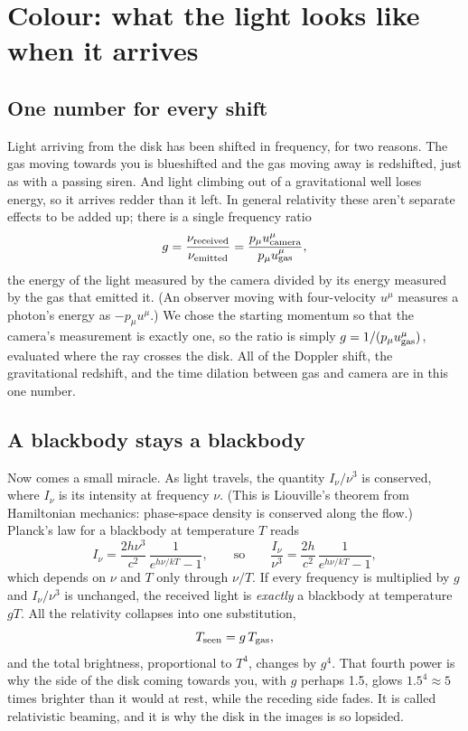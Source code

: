 \documentclass[11pt,a4paper]{article}
\begin{document}
\section{Colour: what the light looks like when it arrives}\label{sec:colour}

\subsection{One number for every shift}

Light arriving from the disk has been shifted in frequency, for two reasons. The gas
moving towards you is blueshifted and the gas moving away is redshifted, just as with a
passing siren. And light climbing out of a gravitational well loses energy, so it arrives
redder than it left. In general relativity these aren't separate effects to be added up;
there is a single frequency ratio
\begin{equation}
  g = \frac{\nu_{\rm received}}{\nu_{\rm emitted}}
    = \frac{p_\mu u^\mu_{\rm camera}}{p_\mu u^\mu_{\rm gas}} ,
\end{equation}
the energy of the light measured by the camera divided by its energy measured by the gas
that emitted it. (An observer moving with four-velocity $u^\mu$ measures a photon's energy
as $-p_\mu u^\mu$.) We chose the starting momentum so that the camera's measurement is
exactly one, so the ratio is simply $g = 1/(p_\mu u^\mu_{\rm gas})$, evaluated where the ray
crosses the disk. All of the Doppler shift, the gravitational redshift, and the time
dilation between gas and camera are in this one number.

\subsection{A blackbody stays a blackbody}

Now comes a small miracle. As light travels, the quantity $I_\nu/\nu^3$ is conserved, where
$I_\nu$ is its intensity at frequency $\nu$. (This is Liouville's theorem from Hamiltonian
mechanics: phase-space density is conserved along the flow.) Planck's law for a blackbody
at temperature $T$ reads
\begin{equation}
  I_\nu = \frac{2h\nu^3}{c^2}\, \frac{1}{e^{h\nu/kT} - 1},
  \qquad\text{so}\qquad
  \frac{I_\nu}{\nu^3} = \frac{2h}{c^2}\, \frac{1}{e^{h\nu/kT} - 1},
\end{equation}
which depends on $\nu$ and $T$ only through $\nu/T$. If every frequency is multiplied by
$g$ and $I_\nu/\nu^3$ is unchanged, the received light is \emph{exactly} a blackbody at
temperature $gT$. All the relativity collapses into one substitution,
\begin{equation}
  T_{\rm seen} = g\, T_{\rm gas} ,
\end{equation}
and the total brightness, proportional to $T^4$, changes by $g^4$. That fourth power is why
the side of the disk coming towards you, with $g$ perhaps 1.5, glows $1.5^4 \approx 5$
times brighter than it would at rest, while the receding side fades. It is called
relativistic beaming, and it is why the disk in the images is so lopsided.
\end{document}
